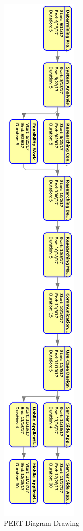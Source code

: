 \begin{figure}[!htbp]
\centering
\includegraphics[scale = 0.7]{projectChapters/images/pert.png}
\caption{PERT Diagram Drawing}
\label{fig:pertDiagram}
\end{figure}

